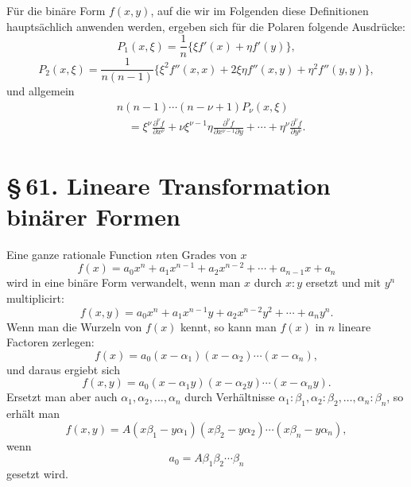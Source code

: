 \documentclass[11pt]{article}
\newcommand{\sect}[2]{\section*{\S\,#1. #2}}
\begin{document}
Für die binäre Form $f(x,y)$, auf die wir im Folgenden diese Definitionen hauptsächlich anwenden werden, ergeben sich für die Polaren folgende Ausdrücke:
\[
 P_1(x,\xi)=\frac1n\{\xi f'(x)+\eta f'(y)\},
\]
\[
 P_2(x,\xi)=\frac1{n(n-1)}\{\xi^2f''(x,x)+2\xi\eta f''(x,y)+\eta^2f''(y,y)\},
\]
und allgemein
\[
\begin{aligned}
&n(n-1)\cdots(n-\nu+1)P_\nu(x,\xi)\\
&\quad=\xi^\nu\frac{\partial^\nu f}{\partial x^\nu}
+\nu\xi^{\nu-1}\eta\frac{\partial^\nu f}{\partial x^{\nu-1}\partial y}
+\cdots+
\eta^\nu\frac{\partial^\nu f}{\partial y^\nu}.
\end{aligned}
\]

\sect{61}{Lineare Transformation binärer Formen}

Eine ganze rationale Function $n$ten Grades von $x$
\begin{equation}
 f(x)=a_0x^n+a_1x^{n-1}+a_2x^{n-2}+\cdots+a_{n-1}x+a_n
\tag{1}
\end{equation}
wird in eine binäre Form verwandelt, wenn man $x$ durch $x:y$ ersetzt und mit $y^n$ multiplicirt:
\begin{equation}
 f(x,y)=a_0x^n+a_1x^{n-1}y+a_2x^{n-2}y^2+\cdots+a_ny^n.
\tag{2}
\end{equation}
Wenn man die Wurzeln von $f(x)$ kennt, so kann man $f(x)$ in $n$ lineare Factoren zerlegen:
\begin{equation}
 f(x)=a_0(x-\alpha_1)(x-\alpha_2)\cdots(x-\alpha_n),
\tag{3}
\end{equation}
und daraus ergiebt sich
\begin{equation}
 f(x,y)=a_0(x-\alpha_1y)(x-\alpha_2y)\cdots(x-\alpha_ny).
\tag{4}
\end{equation}
Ersetzt man aber auch $\alpha_1,\alpha_2,\ldots,\alpha_n$ durch Verhältnisse $\alpha_1:\beta_1,\alpha_2:\beta_2,\ldots,\alpha_n:\beta_n$, so erhält man
\begin{equation}
 f(x,y)=A(x\beta_1-y\alpha_1)(x\beta_2-y\alpha_2)\cdots(x\beta_n-y\alpha_n),
\tag{5}
\end{equation}
wenn
\[
 a_0=A\beta_1\beta_2\cdots\beta_n
\]
gesetzt wird.
\end{document}
